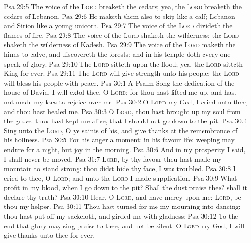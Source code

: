 \vs Psa 29:5 The voice of the \textsc{Lord} breaketh the cedars; yea, the \textsc{Lord} breaketh the cedars of Lebanon.
\vs Psa 29:6 He maketh them also to skip like a calf; Lebanon and Sirion like a young unicorn.
\vs Psa 29:7 The voice of the \textsc{Lord} divideth the flames of fire.
\vs Psa 29:8 The voice of the \textsc{Lord} shaketh the wilderness; the \textsc{Lord} shaketh the wilderness of Kadesh.
\vs Psa 29:9 The voice of the \textsc{Lord} maketh the hinds to calve, and discovereth the forests: and in his temple doth every one speak of  glory.
\vs Psa 29:10 The \textsc{Lord} sitteth upon the flood; yea, the \textsc{Lord} sitteth King for ever.
\vs Psa 29:11 The \textsc{Lord} will give strength unto his people; the \textsc{Lord} will bless his people with peace.
\vs Psa 30:1 A Psalm  Song  the dedication of the house of David. I will extol thee, O \textsc{Lord}; for thou hast lifted me up, and hast not made my foes to rejoice over me.
\vs Psa 30:2 O \textsc{Lord} my God, I cried unto thee, and thou hast healed me.
\vs Psa 30:3 O \textsc{Lord}, thou hast brought up my soul from the grave: thou hast kept me alive, that I should not go down to the pit.
\vs Psa 30:4 Sing unto the \textsc{Lord}, O ye saints of his, and give thanks at the remembrance of his holiness.
\vs Psa 30:5 For his anger  a moment; in his favour  life: weeping may endure for a night, but joy  in the morning.
\vs Psa 30:6 And in my prosperity I said, I shall never be moved.
\vs Psa 30:7 \textsc{Lord}, by thy favour thou hast made my mountain to stand strong: thou didst hide thy face,  I was troubled.
\vs Psa 30:8 I cried to thee, O \textsc{Lord}; and unto the \textsc{Lord} I made supplication.
\vs Psa 30:9 What profit  in my blood, when I go down to the pit? Shall the dust praise thee? shall it declare thy truth?
\vs Psa 30:10 Hear, O \textsc{Lord}, and have mercy upon me: \textsc{Lord}, be thou my helper.
\vs Psa 30:11 Thou hast turned for me my mourning into dancing: thou hast put off my sackcloth, and girded me with gladness;
\vs Psa 30:12 To the end that  glory may sing praise to thee, and not be silent. O \textsc{Lord} my God, I will give thanks unto thee for ever.
